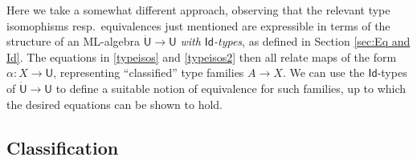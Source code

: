 \documentclass[12pt,reqno]{amsart}
\newcommand{\EE}{\ensuremath{\mathcal{E}}}
\newcommand{\alg}[1]{\ensuremath{\mathsf{#1}}}
\renewcommand{\to}{\ensuremath{\rightarrow}}
\newcommand{\Id}{\mathsf{Id}}
\renewcommand{\t}{\ensuremath{\mathsf{u}}}
\newcommand{\T}{\ensuremath{\mathsf{U}}}
\newcommand{\TT}{\ensuremath{\dot{\mathsf{U}}}}
\theoremstyle{remark}
\theoremstyle{definition}
\begin{document}
Here we take a somewhat different approach, observing that the relevant type isomophisms resp.\ equivalences just mentioned are expressible in terms of the structure of an ML-algebra $\TT \to \T$ \emph{with $\Id{}$-types}, as defined in Section \ref{sec:Eq and Id}. The equations in \eqref{typeisos} and \eqref{typeisos2} 
 then all relate maps of the form $\alpha : X \to \T$, representing ``classified'' type families $A\to X$.  We can use the $\Id{}$-types of $\TT \to \T$ to define a suitable notion of equivalence for such families, up to which the desired equations can be shown to hold. 


\subsection{Classification}\label{sec:classify}
\end{document}
